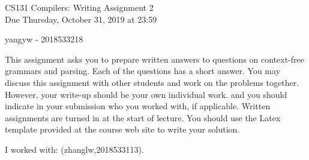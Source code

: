 \documentclass[10pt]{article}
\begin{document}
\begin{center}
\Large CS131 Compilers: Writing Assignment 2\\Due Thursday, October 31, 2019 at 23:59
\end{center}

\begin{center}
\LARGE yangyw - 2018533218
\end{center}

This assignment asks you to prepare written answers to questions on
context-free grammars and parsing. Each of the questions has a short answer. You
may discuss this assignment with other students and work on the problems
together. However, your write-up should be your own individual work.
and you should indicate in your submission who you worked with, if applicable.
Written assignments are turned in at the start of lecture.
You should use the Latex template provided at the course web site to write your solution.

\begin{center}
I worked with: (zhanglw,2018533113).
\end{center}
\end{document}
